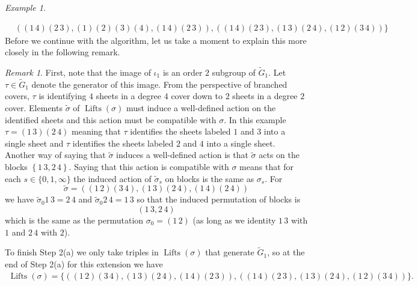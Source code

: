 \documentclass{dcthesis}
\newcommand{\wt}[1]{\widetilde{#1}}
\DeclareMathOperator{\Lifts}{Lifts}
\theoremstyle{definition}
\theoremstyle{remark}
\newtheorem{remark}[prop]{Remark}
\newtheorem{example}[prop]{Example}
\numberwithin{equation}{section}
\numberwithin{figure}{section}
\begin{document}
{{\begin{example}
\begin{itemize}
\begin{align*}
            &((1\,4)(2\,3), (1)(2)(3)(4), (1\,4)(2\,3)),
              ((1\,4)(2\,3), (1\,3)(2\,4), (1\,2)(3\,4))
            \Big\}
          \end{align*}
          Before we continue with the algorithm,
          let us take a moment to explain this more closely in the following remark.
          \begin{remark}\label{rem:actiononblocks}
            First, note that the image of $\iota_1$ is an order $2$ subgroup of
            $\wt{G}_1$.
            Let $\tau\in\wt{G}_1$ denote the generator of this image.
            From the perspective of branched covers,
            $\tau$ is identifying $4$ sheets in a degree $4$ cover down to $2$ sheets
            in a degree $2$ cover.
            Elements $\wt{\sigma}$ of $\Lifts(\sigma)$ must induce a well-defined action on the
            identified sheets and this action must be compatible with $\sigma$.
            In this example $\tau = (1\,3)(2\,4)$ meaning that $\tau$
            identifies the sheets labeled $1$ and $3$ into a single sheet
            and $\tau$ identifies the sheets labeled $2$ and $4$ into a single sheet.
            Another way of saying that $\wt{\sigma}$ induces a well-defined
            action is that $\wt{\sigma}$ acts on the blocks
            $\left\{\boxed{1\,3},\boxed{2\,4}\right\}$.
            Saying that this action is compatible with $\sigma$ means that for each
            $s\in\{0,1,\infty\}$ the induced action of $\wt{\sigma}_s$ on blocks
            is the same as $\sigma_s$.
            For
            \[
              \wt{\sigma} = ((1\,2)(3\,4), (1\,3)(2\,4), (1\,4)(2\,4))
            \]
            we have
            $\wt{\sigma}_0\boxed{1\,3} = \boxed{2\,4}$
            and
            $\wt{\sigma}_0\boxed{2\,4} = \boxed{1\,3}$
            so that the induced permutation of blocks is
            \[
              \left(\boxed{1\,3},\boxed{2\,4}\right)
            \]
            which is the same as the permutation $\sigma_0 = (1\,2)$
            (as long as we identity $\boxed{1\,3}$ with $1$ and $\boxed{2\,4}$ with $2$).
          \end{remark}
          To finish Step 2(a)
          we only take triples in $\Lifts(\sigma)$ that generate $\wt{G}_1$,
          so at the end of Step 2(a) for this extension we have
          \begin{align*}
            \Lifts(\sigma) =
            \Big\{
              ((1\,2)(3\,4), (1\,3)(2\,4), (1\,4)(2\,3)),
              ((1\,4)(2\,3), (1\,3)(2\,4), (1\,2)(3\,4))
            \Big\}.

\end{align*}
\end{itemize}
\end{example}}}
\end{document}
